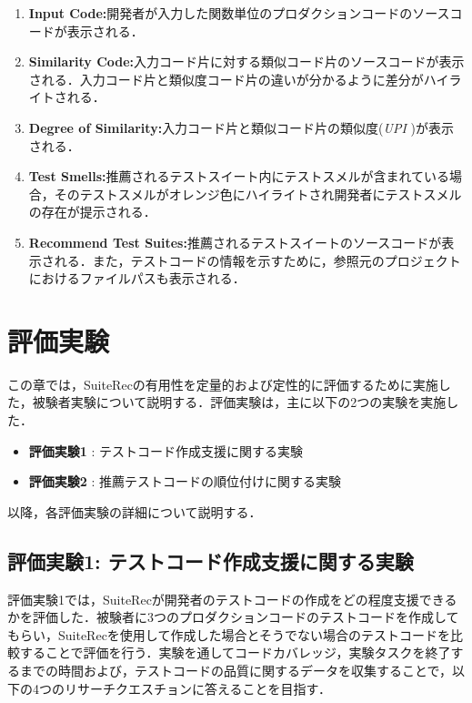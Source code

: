 \documentclass[12pt]{jarticle} %
\begin{document}
\begin{enumerate}
\renewcommand{\labelenumi}{(\arabic{enumi})}
\item{\textbf{Input Code:}開発者が入力した関数単位のプロダクションコードのソースコードが表示される．}
\item{\textbf{Similarity Code:}入力コード片に対する類似コード片のソースコードが表示される．入力コード片と類似度コード片の違いが分かるように差分がハイライトされる．}
\item{\textbf{Degree of Similarity:}入力コード片と類似コード片の類似度({\it UPI} )が表示される．}
\item{\textbf{Test Smells:}推薦されるテストスイート内にテストスメルが含まれている場合，そのテストスメルがオレンジ色にハイライトされ開発者にテストスメルの存在が提示される．}
\item{\textbf{Recommend Test Suites:}推薦されるテストスイートのソースコードが表示される．また，テストコードの情報を示すために，参照元のプロジェクトにおけるファイルパスも表示される．}
\end{enumerate}

\newpage
\section{評価実験}

この章では，{\sf SuiteRec}の有用性を定量的および定性的に評価するために実施した，被験者実験について説明する．評価実験は，主に以下の2つの実験を実施した．

\begin{itemize}
\item \textbf{評価実験1} : テストコード作成支援に関する実験
\item \textbf{評価実験2} : 推薦テストコードの順位付けに関する実験
\end{itemize}

以降，各評価実験の詳細について説明する．

\subsection{評価実験1: テストコード作成支援に関する実験}
評価実験1では，{\sf SuiteRec}が開発者のテストコードの作成をどの程度支援できるかを評価した．被験者に3つのプロダクションコードのテストコードを作成してもらい，{\sf SuiteRec}を使用して作成した場合とそうでない場合のテストコードを比較することで評価を行う．実験を通してコードカバレッジ，実験タスクを終了するまでの時間および，テストコードの品質に関するデータを収集することで，以下の4つのリサーチクエスチョンに答えることを目指す．
\end{document}
